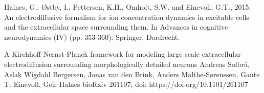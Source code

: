 \documentclass{article}
\begin{document}
\begin{thebibliography}{1}
Halnes, G., Østby, I., Pettersen, K.H., Omholt, S.W. and Einevoll, G.T., 2015. An electrodiffusive formalism for ion concentration dynamics in excitable cells and the extracellular space surrounding them. In Advances in cognitive neurodynamics (IV) (pp. 353-360). Springer, Dordrecht.

A Kirchhoff-Nernst-Planck framework for modeling large scale extracellular electrodiffusion surrounding morphologically detailed neurons
Andreas Solbr\aa, Aslak Wigdahl Bergersen, Jonas van den Brink, Anders Malthe-Sørenssen, Gaute T. Einevoll, Geir Halnes
bioRxiv 261107; doi: https://doi.org/10.1101/261107




\end{thebibliography}
\end{document}
